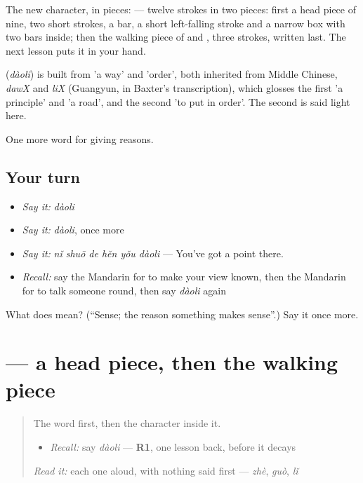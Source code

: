 The new character, in pieces:  — twelve strokes in two pieces: first a head piece of nine, two short strokes, a bar, a short left-falling stroke and a narrow box with two bars inside; then the walking piece of  and , three strokes, written last. The next lesson puts it in your hand.

\begin{cousinweb}
\textbf{} (\emph{dàoli}) is built from  'a way' and  'order', both inherited from Middle Chinese, \emph{dawX} and \emph{liX} (Guangyun, in Baxter's transcription), which glosses the first 'a principle' and 'a road', and the second 'to put in order'. The second is said light here.
\end{cousinweb}

\begin{grammarlens}[title={What you've built}]
One more word for giving reasons.
\end{grammarlens}

\subsection*{Your turn}
\begin{itemize}
\raggedright
  \item \emph{Say it:} \emph{dàoli}
  \item \emph{Say it:} \emph{dàoli}, once more
  \item \emph{Say it:} \emph{nǐ shuō de hěn yǒu dàoli} — You've got a point there.
  \item \emph{Recall:} say the Mandarin for to make your view known, then the Mandarin for to talk someone round, then say \emph{dàoli} again
\end{itemize}

\begin{tcolorbox}[breakable,colback=teal!4,colframe=teal!35!black,title={Before you move on}]
What does  mean? (\textquotedblleft{}Sense; the reason something makes sense\textquotedblright{}.) Say it once more.
\end{tcolorbox}
\section[\texorpdfstring{\zh{道} (dào)}{道 (dào)}]{ — a head piece, then the walking piece}

\label{lesson:ZH-W353-dao-way}



\begin{quote}
The word first, then the character inside it.

\begin{itemize}
\raggedright
  \item \emph{Recall:} say \emph{dàoli} — \textbf{R1}, one lesson back, before it decays
\end{itemize}

\begin{quote}
  
\end{quote}

\emph{Read it:} each one aloud, with nothing said first — \emph{zhè}, \emph{guò}, \emph{lǐ}
\end{quote}

